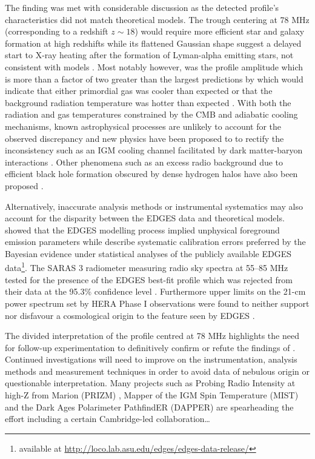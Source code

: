 The finding was met with considerable discussion as the detected profile’s characteristics did not match theoretical models. The trough centering at 78 MHz (corresponding to a redshift $z \sim 18$) would require more efficient star and galaxy formation at high redshifts \citep{edges_star_formation} while its flattened Gaussian shape suggest a delayed start to X-ray heating after the formation of Lyman-alpha emitting stars, not consistent with models \citep{theory_models}. Most notably however, was the profile amplitude which is more than a factor of two greater than the largest predictions by \citet{theory_models} which would indicate that either primordial gas was cooler than expected or that the background radiation temperature was hotter than expected \citep{edgesNature}. With both the radiation and gas temperatures constrained by the CMB and adiabatic cooling mechanisms, known astrophysical processes are unlikely to account for the observed discrepancy and new physics have been proposed to to rectify the inconsistency such as an IGM cooling channel facilitated by dark matter-baryon interactions \citep{edgesNature}. Other phenomena such as an excess radio background due to efficient black hole formation obscured by dense hydrogen halos have also been proposed \citep{ew_radio_background}.

Alternatively, inaccurate analysis methods or instrumental systematics may also account for the disparity between the EDGES data and theoretical models. \citet{hills_concerns} showed that the EDGES modelling process implied unphysical foreground emission parameters while \citet{sims_concerns} describe systematic calibration errors preferred by the Bayesian evidence under statistical analyses of the publicly available EDGES data\footnote{available at \url{http://loco.lab.asu.edu/edges/edges-data-release/}}. The SARAS 3 radiometer measuring radio sky spectra at 55--85 MHz tested for the presence of the EDGES best-fit profile which was rejected from their data at the 95.3\% confidence level \citep{saras_reject}. Furthermore upper limits on the 21-cm power spectrum set by HERA Phase I observations were found to neither support nor disfavour a cosmological origin to the feature seen by EDGES \citep{hera_limits}.

The divided interpretation of the profile centred at 78 MHz highlights the need for follow-up experimentation to definitively confirm or refute the findings of \citet{edgesNature}. Continued investigations will need to improve on the instrumentation, analysis methods and measurement techniques in order to avoid data of nebulous origin or questionable interpretation. Many projects such as Probing Radio Intensity at high-Z from Marion (PRIZM) \citep{prizm}, Mapper of the IGM Spin Temperature (MIST) \citep{mist} and the Dark Ages Polarimeter PathfindER (DAPPER) \citep{dapper} are spearheading the effort including a certain Cambridge-led collaboration…


